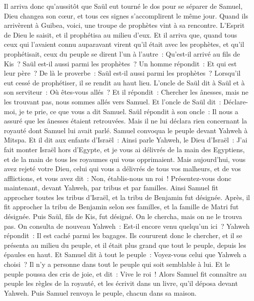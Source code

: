 \begin{multicols}{2}
Il arriva donc qu'aussitôt que Saül eut tourné le dos pour se séparer de Samuel, Dieu changea son cœur, et tous ces signes s'accomplirent le même jour.
Quand ils arrivèrent à Guibea, voici, une troupe de prophètes vint à sa rencontre. L'Esprit de Dieu le saisit, et il prophétisa au milieu d'eux.
Et il arriva que, quand tous ceux qui l'avaient connu auparavant virent qu'il était avec les prophètes, et qu'il prophétisait, ceux du peuple se dirent l'un à l'autre~: Qu'est-il arrivé au fils de Kis~? Saül est-il aussi parmi les prophètes~?
Un homme répondit~: Et qui est leur père~? De là le proverbe~: Saül est-il aussi parmi les prophètes~?
Lorsqu'il eut cessé de prophétiser, il se rendit au haut lieu.
L'oncle de Saül dit à Saül et à son serviteur~: Où êtes-vous allés~? Et il répondit~: Chercher les ânesses, mais ne les trouvant pas, nous sommes allés vers Samuel.
Et l'oncle de Saül dit~: Déclare-moi, je te prie, ce que vous a dit Samuel.
Saül répondit à son oncle~: Il nous a assuré que les ânesses étaient retrouvées. Mais il ne lui déclara rien concernant la royauté dont Samuel lui avait parlé.
Samuel convoqua le peuple devant Yahweh à Mitspa.
Et il dit aux enfants d'Israël~: Ainsi parle Yahweh, le Dieu d'Israël~: J'ai fait monter Israël hors d'Egypte, et je vous ai délivrés de la main des Egyptiens, et de la main de tous les royaumes qui vous opprimaient.
Mais aujourd'hui, vous avez rejeté votre Dieu, celui qui vous a délivrés de tous vos malheurs, et de vos afflictions, et vous avez dit~: Non, établis-nous un roi~! Présentez-vous donc maintenant, devant Yahweh, par tribus et par familles.
Ainsi Samuel fit approcher toutes les tribus d'Israël, et la tribu de Benjamin fut désignée.
Après, il fit approcher la tribu de Benjamin selon ses familles, et la famille de Matri fut désignée. Puis Saül, fils de Kis, fut désigné. On le chercha, mais on ne le trouva pas.
On consulta de nouveau Yahweh~: Est-il encore venu quelqu'un ici~? Yahweh répondit~: Il est caché parmi les bagages.
Ils coururent donc le chercher, et il se présenta au milieu du peuple, et il était plus grand que tout le peuple, depuis les épaules en haut.
Et Samuel dit à tout le peuple~: Voyez-vous celui que Yahweh a choisi~? Il n'y a personne dans tout le peuple qui soit semblable à lui. Et le peuple poussa des cris de joie, et dit~: Vive le roi~!
Alors Samuel fit connaître au peuple les règles de la royauté, et les écrivit dans un livre, qu'il déposa devant Yahweh. Puis Samuel renvoya le peuple, chacun dans sa maison.

\end{multicols}

